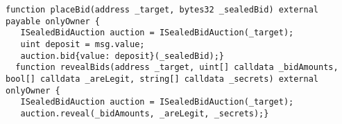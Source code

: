 \begin{lstlisting}[language=Solidity, firstnumber=12]
  function placeBid(address _target, bytes32 _sealedBid) external payable onlyOwner {
   ISealedBidAuction auction = ISealedBidAuction(_target);
   uint deposit = msg.value;
   auction.bid{value: deposit}(_sealedBid);}
  function revealBids(address _target, uint[] calldata _bidAmounts, bool[] calldata _areLegit, string[] calldata _secrets) external onlyOwner {
   ISealedBidAuction auction = ISealedBidAuction(_target);
   auction.reveal(_bidAmounts, _areLegit, _secrets);}
\end{lstlisting}